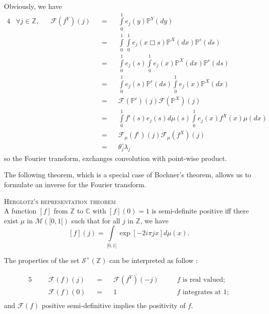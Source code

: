 Obviously, we have
\begin{alignat*}{4}
&\forall j \in \mathds{Z}, && \mathcal{F}(f^{Y})(j)&&=&&\int\limits_{0}^{1} e_{j}(y) \mathds{P}^{Y}(dy)\\
& && &&=&&\int\limits_{0}^{1}\int\limits_{0}^{1} e_{j}(x \Box s) \mathds{P}^{X}(dx)\mathds{P}^{\epsilon}(ds)\\
& && &&=&&\int\limits_{0}^{1}e_{j}(s)\int\limits_{0}^{1} e_{j}(x) \mathds{P}^{X}(dx)\mathds{P}^{\epsilon}(ds)\\
& && &&=&&\int\limits_{0}^{1}e_{j}(s)\mathds{P}^{\epsilon}(ds)\int\limits_{0}^{1} e_{j}(x)\mathds{P}^{X}(dx)\\
& && &&=&&\mathcal{F}(\mathds{P}^{\epsilon})(j) \mathcal{F}(\mathds{P}^{X})(j)\\
& && &&=&&\int\limits_{0}^{1} f^{\epsilon}(s) e_{j}(s) d\mu(s) \int\limits_{0}^{1} e_{j}(x) f^{X}(x)\mu(dx)\\
& && &&=&&\mathcal{F}_{\mu}(f^{\epsilon})(j) \mathcal{F}_{\mu}(f^{X})(j)\\
& && &&=&& \theta^{\circ}_{j} \lambda_{j}
\end{alignat*}
so the Fourier transform, exchanges convolution with point-wise product.

\medskip

The following theorem, which is a special case of Bochner's theorem, allows us to formulate an inverse for the Fourier transform.

\begin{thm}{\textsc{Herglotz's representation theorem}\\}\label{THM_INTRO_CIRCULARDECONVOLUTION_HERGLOTZ}
A function $[f]$ from $\mathds{Z}$ to $\mathds{C}$ with $[f](0) = 1$ is semi-definite positive iff there exist $\mu$ in $\mathcal{M}([0, 1[)$ such that for all $j$ in $\mathds{Z}$, we have
\[[f](j) = \int\limits_{[0, 1[} \exp[- 2 i \pi j x] d\mu(x).\]
\end{thm}

The properties of the set $\mathcal{S}^{+}(\mathds{Z})$ can be interpreted as follow :

\begin{alignat*}{5}
& && \mathcal{F}(f)(j)&&=&& \overline{\mathcal{F}(f^{Y})(-j)}&& \quad f \text{ is real valued;}\\ 
& && \mathcal{F}(f)(0) &&=&& 1&& \quad f \text{ integrates at }1;\\
\end{alignat*}
and $\mathcal{F}(f)$ positive semi-definitive implies the positivity of $f$.


